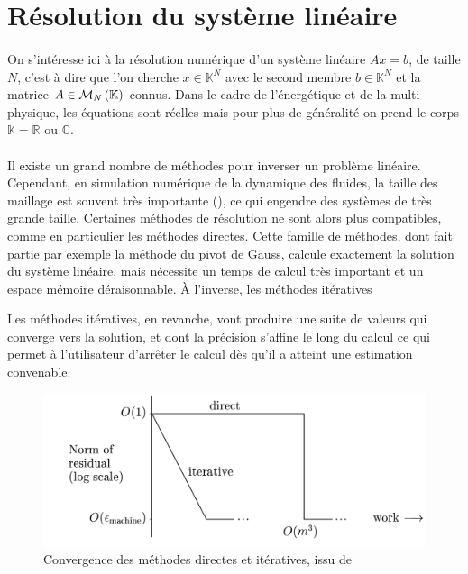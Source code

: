 \section{Résolution du système linéaire}

	\paragraph{} On s'intéresse ici à la résolution numérique d'un système linéaire $Ax = b$, de taille $N$, c'est à dire que l'on cherche $x\in\mathbb{K}^N$ avec le second membre $b\in\mathbb{K}^N$ et la matrice $A\in\mathcal{M}_{N}\left(\mathbb{K}\right)$ connus.
	Dans le cadre de l'énergétique et de la multi-physique, les équations sont réelles mais pour plus de généralité on prend le corps $\mathbb{K} = \mathbb{R}\textrm{ ou }\mathbb{C}$.

	\paragraph{} Il existe un grand nombre de méthodes pour inverser un problème linéaire.
	Cependant, en simulation numérique de la dynamique des fluides, la taille des maillage est souvent très importante (), ce qui engendre des systèmes de très grande taille.
	Certaines méthodes de résolution ne sont alors plus compatibles, comme en particulier les méthodes directes.
	Cette famille de méthodes, dont fait partie par exemple la méthode du pivot de Gauss, calcule exactement la solution du système linéaire, mais nécessite un temps de calcul très important et un espace mémoire déraisonnable. À l'inverse, les méthodes itératives

	Les méthodes itératives, en revanche, vont produire une suite de valeurs qui converge vers la solution, et dont la précision s’affine le long du calcul ce qui permet à l'utilisateur d’arrêter le calcul dès qu'il a atteint une estimation convenable.

	\begin{figure}
		\includegraphics[width=\textwidth]{images/direct-iterative.png}
		\caption{Convergence des méthodes directes et itératives, issu de \cite{TrefethenBau1997}}
		\label{fig:direct-iterative}
	\end{figure}



